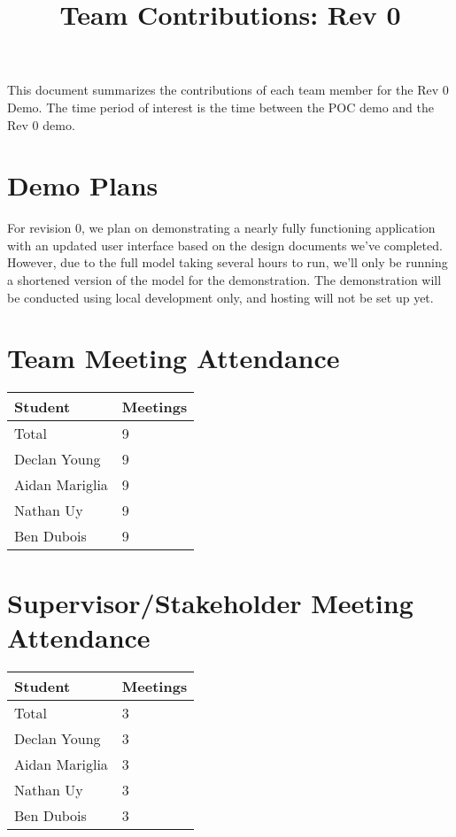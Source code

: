 \documentclass{article}
\title{Team Contributions: Rev 0\\\progname}
\author{\authname}
\date{}
\begin{document}
\maketitle

This document summarizes the contributions of each team member for the Rev 0
Demo.  The time period of interest is the time between the POC demo and the Rev
0 demo.

\section{Demo Plans}

For revision 0, we plan on demonstrating a nearly fully functioning application with an updated user interface based on the design documents we've completed. However, due to the full model taking several hours to run, we'll only be running a shortened version of the model for the demonstration. The demonstration will be conducted using local development only, and hosting will not be set up yet.

\section{Team Meeting Attendance}

\begin{table}[H]
\centering
\begin{tabular}{ll}
\toprule
\textbf{Student} & \textbf{Meetings}\\
\midrule
Total & 9\\
Declan Young & 9\\
Aidan Mariglia & 9\\
Nathan Uy & 9\\
Ben Dubois & 9\\
\bottomrule
\end{tabular}
\end{table}


\section{Supervisor/Stakeholder Meeting Attendance}

\begin{table}[H]
\centering
\begin{tabular}{ll}
\toprule
\textbf{Student} & \textbf{Meetings}\\
\midrule
Total & 3\\
Declan Young & 3\\
Aidan Mariglia & 3\\
Nathan Uy & 3\\
Ben Dubois & 3\\
\bottomrule
\end{tabular}
\end{table}
\end{document}
